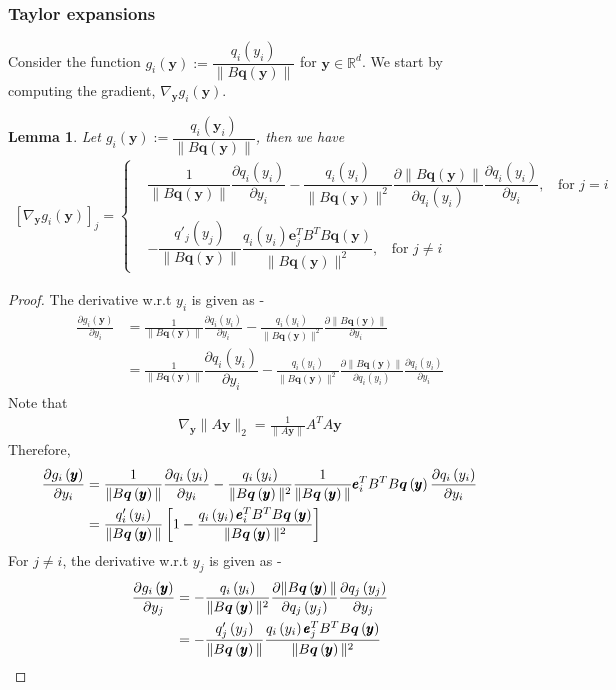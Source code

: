 \documentclass[letterpaper]{article}
\newtheorem{lemma}[theorem]{Lemma}
\newcommand{\ba}[1]{\begin{align}#1\end{align}}
\newcommand{\bas}[1]{\begin{align*}#1\end{align*}}
\newcommand{\by}{\pmb{y}}
\newcommand{\be}{\pmb{e}}
\newcommand{\bb}[1]{\left(#1\right)}
\newcommand{\bbb}[1]{\left[#1\right]}
\begin{document}
\subsubsection{Taylor expansions}
Consider the function $g_{i}\bb{\bm{y}} := \dfrac{q_{i}\bb{y_{i}}}{\|B\bm{q}\bb{\by}\|}$ for $\by \in \mathbb{R}^{d}$. We start by computing the gradient, $\nabla_{\bm{y}} g_{i}\bb{\bm{y}}$.
\begin{lemma} \label{lemma:grad_g_i} 
    Let $g_{i}\bb{\bm{y}} := \dfrac{q_{i}\bb{\bm{y}_{i}}}{\|B\bm{q}\bb{\by}\|}$, then we have
    \bas{
        \bbb{\nabla_{\bm{y}} g_{i}\bb{\bm{y}}}_{j} = \begin{cases}
                                & \dfrac{1}{\|B\bm{q}\bb{\by}\|}\dfrac{\partial q_{i}\bb{y_{i}}}{\partial y_{i}} - \dfrac{q_{i}\bb{y_{i}}}{\|B\bm{q}\bb{\by}\|^{2}}\dfrac{\partial \|B\bm{q}\bb{\by}\|}{\partial q_{i}\bb{y_{i}}}\dfrac{\partial q_{i}\bb{y_{i}}}{\partial y_{i}}, \;\; \text{ for } j = i \\ \\
                                & -\dfrac{q'_{j}\bb{y_{j}}}{\|B\bm{q}\bb{\by}\|}\dfrac{q_{i}\bb{y_{i}}\be_{j}^{T}B^{T}B\bm{q}\bb{\by}}{\|B\bm{q}\bb{\by}\|^{2}}, \;\; \text{ for } j \neq i
                            \end{cases}
    }
\end{lemma}
\begin{proof} The derivative w.r.t $y_{i}$ is given as - 
\bas{
    \frac{\partial g_{i}\bb{\by}}{\partial y_{i}} &= \frac{1}{\|B\bm{q}\bb{\by}\|}\frac{\partial q_{i}\bb{y_{i}}}{\partial y_{i}} - \frac{q_{i}\bb{y_{i}}}{\|B\bm{q}\bb{\by}\|^{2}}\frac{\partial \|B\bm{q}\bb{\by}\|}{\partial y_{i}} \\ 
    &= \frac{1}{\|B\bm{q}\bb{\by}\|}\dfrac{\partial q_{i}\bb{y_{i}}}{\partial y_{i}} - \frac{q_{i}\bb{y_{i}}}{\|B\bm{q}\bb{\by}\|^{2}}\frac{\partial \|B\bm{q}\bb{\by}\|}{\partial q_{i}\bb{y_{i}}}\frac{\partial q_{i}\bb{y_{i}}}{\partial y_{i}}
} 
Note that 
\bas{
    \nabla_{\by} \|A\by\|_{2} = \frac{1}{\|A\by\|}A^{T}A\by
}
Therefore, 
\ba{
    \frac{\partial g_{i}\bb{\by}}{\partial y_{i}} &= \frac{1}{\|B\bm{q}\bb{\by}\|}\frac{\partial q_{i}\bb{y_{i}}}{\partial y_{i}} - \frac{q_{i}\bb{y_{i}}}{\|B\bm{q}\bb{\by}\|^{2}}\frac{1}{\|B\bm{q}\bb{\by}\|}\be_{i}^{T}B^{T}B\bm{q}\bb{\by}\frac{\partial q_{i}\bb{y_{i}}}{\partial y_{i}} \notag \\
    &= \frac{q_{i}'\bb{y_{i}}}{\|B\bm{q}\bb{\by}\|}\bbb{1 - \frac{q_{i}\bb{y_{i}}\be_{i}^{T}B^{T}B\bm{q}\bb{\by}}{\|B\bm{q}\bb{\by}\|^{2}}} \label{eq:derivative_of_gi_xi}
}
For $j \neq i$, the derivative w.r.t $y_{j}$ is given as -  
\ba{
   \frac{\partial g_{i}\bb{\by}}{\partial y_{j}} &= -\frac{q_{i}\bb{y_{i}}}{ \|B\bm{q}\bb{\by}\|^{2}}\frac{\partial \|B\bm{q}\bb{\by}\|}{\partial q_{j}\bb{y_{j}}}\frac{\partial q_{j}\bb{y_{j}}}{\partial y_{j}} \notag \\ 
   &= -\frac{q'_{j}\bb{y_{j}}}{\|B\bm{q}\bb{\by}\|}\frac{q_{i}\bb{y_{i}}\be_{j}^{T}B^{T}B\bm{q}\bb{\by}}{\|B\bm{q}\bb{\by}\|^{2}} \label{eq:derivative_of_gi_xj}
}
\end{proof}
\end{document}
